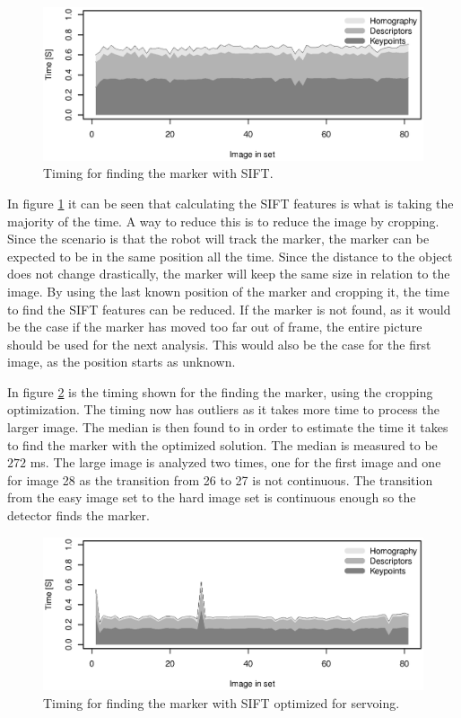 \begin{figure}[h]
 \centering
 \includegraphics[width=\linewidth]{graphics/marker3_timing_unoptimized}
 \caption{Timing for finding the marker with SIFT.}
 \label{fig:time_sift_unoptimized}
\end{figure}

In figure \ref{fig:time_sift_unoptimized} it can be seen that calculating the SIFT features is what is taking the majority of the time.
A way to reduce this is to reduce the image by cropping.
Since the scenario is that the robot will track the marker, the marker can be expected to be in the same position all the time.
Since the distance to the object does not change drastically, the marker will keep the same size in relation to the image.
By using the last known position of the marker and cropping it, the time to find the SIFT features can be reduced.
If the marker is not found, as it would be the case if the marker has moved too far out of frame, the entire picture should be used for the next analysis.
This would also be the case for the first image, as the position starts as unknown.

In figure \ref{fig:time_sift_crop} is the timing shown for the finding the marker, using the cropping optimization.
The timing now has outliers as it takes more time to process the larger image.
The median is then found to in order to estimate the time it takes to find the marker with the optimized solution.
The median is measured to be $272$ ms.
The large image is analyzed two times, one for the first image and one for image 28 as the transition from 26 to 27 is not continuous.
The transition from the easy image set to the hard image set is continuous enough so the detector finds the marker.

\begin{figure}[h]
 \centering
 \includegraphics[width=\linewidth]{graphics/marker3_timing_crop}
 \caption{Timing for finding the marker with SIFT optimized for servoing.}
 \label{fig:time_sift_crop}
\end{figure}


